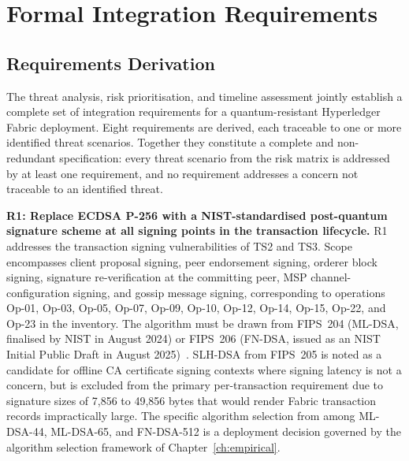 \documentclass[conference]{IEEEtran}
\begin{document}
\section{Formal Integration Requirements}
\label{sec:tm_requirements}

\subsection{Requirements Derivation}

The threat analysis, risk prioritisation, and timeline assessment jointly
establish a complete set of integration requirements for a quantum-resistant
Hyperledger Fabric deployment. Eight requirements are derived, each
traceable to one or more identified threat scenarios. Together they
constitute a complete and non-redundant specification: every threat
scenario from the risk matrix is addressed by at least one requirement,
and no requirement addresses a concern not traceable to an identified
threat.

\textbf{R1: Replace ECDSA P-256 with a NIST-standardised post-quantum
signature scheme at all signing points in the transaction lifecycle.}
R1 addresses the transaction signing vulnerabilities of TS2 and TS3.
Scope encompasses client proposal signing, peer endorsement signing,
orderer block signing, signature re-verification at the committing
peer, MSP channel-configuration signing, and gossip message signing,
corresponding to operations Op-01, Op-03, Op-05, Op-07, Op-09, Op-10,
Op-12, Op-14, Op-15, Op-22, and Op-23 in the inventory. The algorithm must be drawn from FIPS~204 (ML-DSA, finalised by NIST in
August 2024) or FIPS~206 (FN-DSA, issued as an NIST Initial Public Draft
in August 2025)~\cite{nist_fips204, nist_fips206}.
SLH-DSA from FIPS~205 is noted as a candidate for offline CA certificate
signing contexts where signing latency is not a concern, but is excluded
from the primary per-transaction requirement due to signature sizes of
7,856 to 49,856 bytes that would render Fabric transaction records
impractically large. The specific algorithm selection from among ML-DSA-44,
ML-DSA-65, and FN-DSA-512 is a deployment decision governed by the
algorithm selection framework of Chapter~\ref{ch:empirical}.
\end{document}
